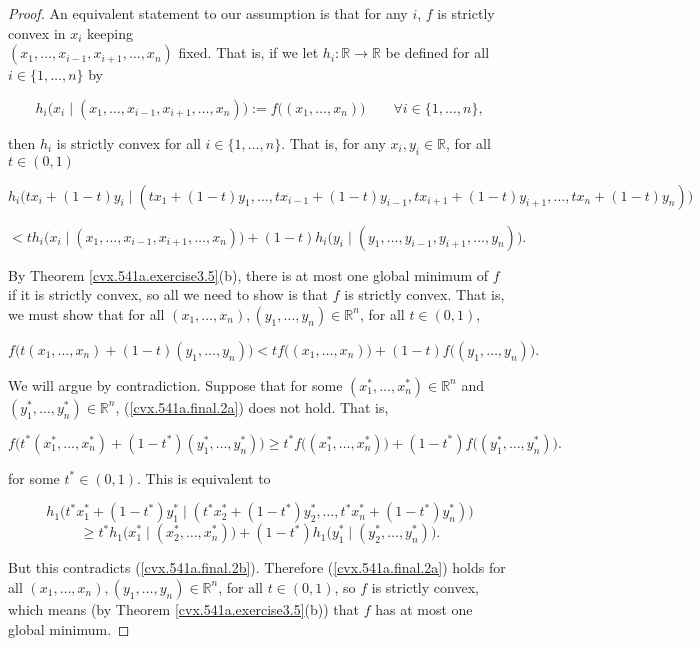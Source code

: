 \begin{proof}An equivalent statement to our assumption is that for any \(i\), \(f\) is strictly convex in \(x_i\) keeping \\ \((x_1, \ldots, x_{i-1}, x_{i+1}, \ldots, x_n)\) fixed. That is, if we let \(h_i: \mathbb{R} \to \mathbb{R}\) be defined for all \(i \in \{1, \ldots, n\}\) by

\[
h_i \big(x_i \mid (x_1, \ldots, x_{i-1}, x_{i+1}, \ldots, x_n) \big) := f\big( (x_1, \ldots, x_n) \big) \qquad \forall i \in \{1, \ldots, n\},
\] 

then \(h_i\) is strictly convex for all \(i \in \{1, \ldots, n\}\). That is, for any \(x_i, y_i \in \mathbb{R}\), for all \(t \in (0,1)\)

\[
 h_i \big(tx_i + (1-t)y_i  \mid (tx_1 + (1-t)y_1, \ldots, tx_{i-1} + (1-t)y_{i-1}, tx_{i+1} + (1-t)y_{i+1}, \ldots, tx_n + (1-t)y_n) \big) 
\]
 
\begin{equation}\label{cvx.541a.final.2b}
  < t h_i \big(x_i  \mid (x_1, \ldots, x_{i-1}, x_{i+1}, \ldots, x_n) \big) + (1-t) h_i \big(y_i \mid  (y_1, \ldots, y_{i-1}, y_{i+1}, \ldots, y_n)  \big).
\end{equation}

By Theorem \ref{cvx.541a.exercise3.5}(b), there is at most one global minimum of \(f\) if it is strictly convex, so all we need to show is that \(f\) is strictly convex. That is, we must show that for all \((x_1, \ldots, x_n), (y_1, \ldots, y_n) \in \mathbb{R}^n\), for all \(t \in (0,1)\),

\begin{equation}\label{cvx.541a.final.2a}
f \big(t(x_1, \ldots, x_n) + (1-t)(y_1, \ldots, y_n) \big) < t f \big( (x_1, \ldots, x_n)  \big) + (1-t) f \big( (y_1, \ldots, y_n)  \big).
\end{equation}

We will argue by contradiction. Suppose that for some \((x_1^*, \ldots, x_n^*) \in \mathbb{R}^n\) and \((y_1^*, \ldots, y_n^*) \in \mathbb{R}^n\), (\ref{cvx.541a.final.2a}) does not hold. That is, 

\[
f \big(t^*(x_1^*, \ldots, x_n^*) + (1-t^*)(y_1^*, \ldots, y_n^*) \big) \geq t^* f \big( (x_1^*, \ldots, x_n^*)  \big) + (1-t^*) f \big( (y_1^*, \ldots, y_n^*)  \big).
\]

for some \(t^* \in (0,1)\). This is equivalent to

\[
 h_1 \big(t^*x_1^* + (1-t^*)y_1^*  \mid (t^*x_2^* + (1-t^*)y_2^*, \ldots,  t^*x_n^* + (1-t^*)y_n^*)  \big) 
 \]
 \[
   \geq t^* h_1 \big(x_1^* \mid (x_2^*, \ldots, x_n^*) \big) + (1-t^*) h_1 \big(y_1^* \mid  (y_2^*, \ldots,  y_n^*)  \big).
\]

 But this contradicts (\ref{cvx.541a.final.2b}). Therefore (\ref{cvx.541a.final.2a}) holds  for all \((x_1, \ldots, x_n), (y_1, \ldots, y_n) \in \mathbb{R}^n\), for all \(t \in (0,1)\), so \(f\) is strictly convex, which means (by Theorem \ref{cvx.541a.exercise3.5}(b)) that \(f\) has at most one global minimum.
 

\end{proof}


